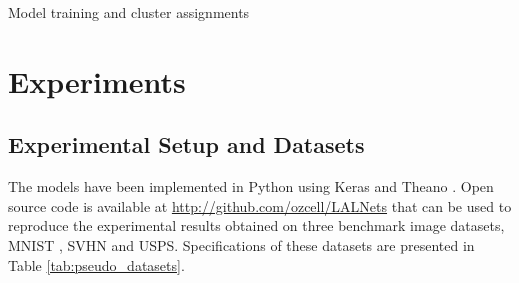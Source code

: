 \documentclass{article} \usepackage{iclr2018_conference,times}
\begin{document}
\begin{algorithm}[t]
	\label{algo:pseudo_training}
	\begin{small}
		\DontPrintSemicolon
		
		{
			
			
			
			
			
		}
		
		
		\caption{Model training and cluster assignments}
		
	\end{small}
\end{algorithm}
 
\section{Experiments}
\subsection{Experimental Setup and Datasets}
The models have been implemented in Python using Keras \citep{chollet2015keras} and Theano \citep{Theano}. Open source code is available at \hyperref{http://github.com/ozcell/LALNets}{}{}{http://github.com/ozcell/LALNets} that can be used to reproduce the experimental results obtained on three benchmark image datasets, MNIST \citep{lecun1998mnist}, SVHN \citep{svhn} and USPS. Specifications of these datasets are presented in Table \ref{tab:pseudo_datasets}.
\end{document}
